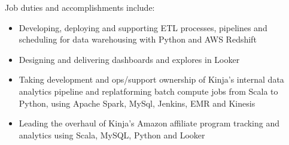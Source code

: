 \normalsize
Job duties and accomplishments include:
\small
\begin{itemize}
    \item Developing, deploying and supporting ETL processes, pipelines and scheduling for data warehousing with Python and AWS Redshift
    \item Designing and delivering dashboards and explores in Looker
    \item Taking development and ops/support ownership of Kinja's internal data analytics pipeline and replatforming batch compute jobs from Scala to Python, using Apache Spark, MySql, Jenkins, EMR and Kinesis
    \item Leading the overhaul of Kinja's Amazon affiliate program tracking and analytics using Scala, MySQL, Python and Looker
\end{itemize}
\normalsize
\medskip
